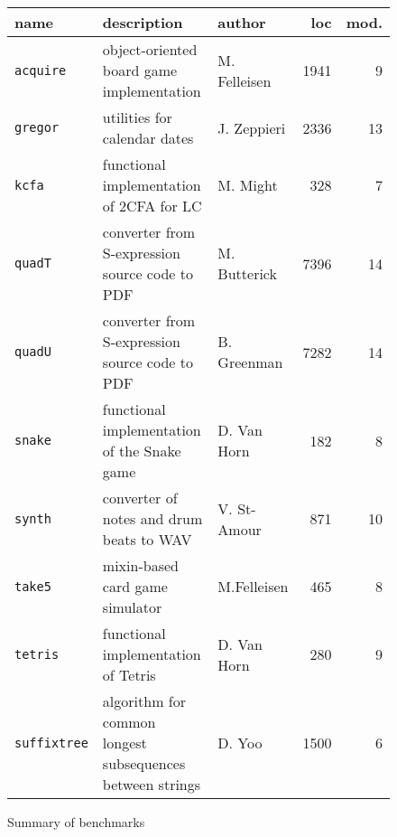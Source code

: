 
\begin{figure*} \footnotesize
\begin{tabular}{p{1.5cm} | p{6.9cm} | p{1.9cm} | r | r}
             {\bf  name} & {\bf description} & {\bf author} & {\bf loc} & {\bf mod.} \\ \hline

\texttt{acquire} & object-oriented board game implementation      & M. Felleisen & 1941 & 9 \\ \hline

\texttt{gregor}  & utilities for calendar dates                   & J. Zeppieri  & 2336 & 13\\ \hline

\texttt{kcfa}    & functional implementation of 2CFA for LC       & M. Might & 328 & 7\\ \hline

\texttt{quadT}   & converter from S-expression source code to PDF & M. Butterick & 7396 & 14\\ \hline

\texttt{quadU}   & converter from S-expression source code to PDF & B. Greenman  & 7282 & 14 \\ \hline

\texttt{snake}   & functional implementation of the Snake game    & D. Van Horn & 182 & 8 \\ \hline

\texttt{synth}  & converter of notes and drum beats to WAV & V. St-Amour & 871 & 10 \\ \hline

\texttt{take5} & mixin-based card game simulator & M.Felleisen & 465 & 8\\ \hline

\texttt{tetris} & functional implementation of Tetris & D. Van Horn &   280 & 9 \\ \hline

\texttt{suffix\-tree} & algorithm for common longest subsequences between strings & D. Yoo & 1500 & 6 \\

\end{tabular}

\caption{Summary of benchmarks} \label{table:benchmark-descriptions}

\end{figure*}

